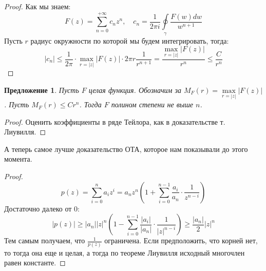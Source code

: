 \documentclass[12pt,a4paper]{article} %
\newtheorem{proposition}{Предложение}
\begin{document}
	\begin{proof}
		Как мы знаем:
		$$F(z)=\displaystyle\sum_{n=0}^{+\infty}c_nz^n,\quad c_n=\frac{1}{2\pi i}\oint\limits_{\gamma}\frac{F(w)dw}{w^{n+1}}$$
		Пусть $r$ радиус окружности по которой мы будем интегрировать, тогда:
		$$|c_n|\leq \frac{1}{2\pi}\cdot\underset{r=|z|}{\max}|F(z)|\cdot 2\pi r\frac{1}{r^{n+1}}=\frac{\underset{r=|z|}{\max}|F(z)|}{r^n}\leq \frac{C}{r^n}$$
	\end{proof}
	\begin{proposition}
		Пусть $F$ целая функция. Обозначим за $M_F(r)=\underset{r=|z|}{\max}|F(z)|$. Пусть $M_F(r)\leq Cr^n$. Тогда $F$ полином степени не выше $n$.
	\end{proposition}
	\begin{proof}
		Оценить коэффициенты в ряде Тейлора, как в доказательстве т. Лиувилля.
	\end{proof}
	А теперь самое лучше доказательство ОТА, которое нам показывали до этого момента.
	\begin{proof}
		$$p(z)=\displaystyle\sum_{i=0}^na_i z^i=a_n z^n\left(1+\sum_{i=0}^{n-1}\displaystyle\frac{a_i}{a_n}\cdot\displaystyle\frac{1}{z^{n-i}}\right)$$
		Достаточно далеко от 0:
		$$|p(z)|\geq |a_n||z|^n\left(1-\displaystyle\sum_{i=0}^{n-1}\displaystyle\frac{|a_i|}{|a_n|}\cdot\displaystyle\frac{1}{|z|^{n-i}}\right)\geq \displaystyle\frac{|a_n|}{2}|z|^n$$
		Тем самым получаем, что $\displaystyle\frac{1}{p(z)}$ ограничена. Если предположить, что корней нет, то тогда она еще и целая, а тогда по теореме Лиувилля исходный многочлен равен константе.
	\end{proof}
\end{document}

